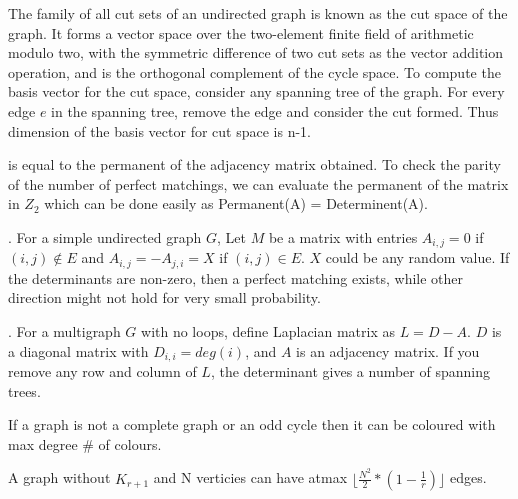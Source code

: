  The family of all cut sets of an undirected graph is known as the cut space of the graph. It forms a vector space over the two-element finite field of arithmetic modulo two, with the symmetric difference of two cut sets as the vector addition operation, and is the orthogonal complement of the cycle space.      
To compute the basis vector for the cut space, consider any spanning tree of the graph. For every edge $e$ in the spanning tree, remove the edge and consider the cut formed. Thus dimension of the basis vector for cut space is n-1.

 is equal to the permanent of the adjacency matrix obtained. To check the parity of the number of perfect matchings, we can evaluate the permanent of the matrix in $Z_{2}$ which can be done easily as Permanent(A) = Determinent(A).

. For a simple undirected graph $G$, Let $M$ be a matrix with entries $A_{i, j} = 0$ if $(i, j) \notin E$ and $A_{i, j} = -A_{j, i} = X$ if $(i, j) \in E$. $X$ could be any random value. If the determinants are non-zero, then a perfect matching exists, while other direction might not hold for very small probability.


. For a multigraph $G$ with no loops, define Laplacian matrix as $L = D - A$. $D$ is a diagonal matrix with $D_{i, i} = deg(i)$, and $A$ is an adjacency matrix. If you remove any row and column of $L$, the determinant gives a number of spanning trees.

 If a graph is not a complete graph or an odd cycle then it can be coloured with max degree \# of colours.

 A graph without $K_{r+1}$ and N verticies can have atmax $\lfloor \frac{N^{2}}{2} * (1 - \frac{1}{r}) \rfloor$ edges. 
